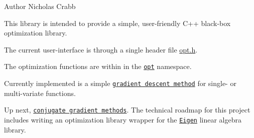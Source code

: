 \begin{DoxyAuthor}{Author}
Nicholas Crabb
\end{DoxyAuthor}
This library is intended to provide a simple, user-\/friendly C++ black-\/box optimization library.

The current user-\/interface is through a single header file \mbox{\hyperlink{opt_8h_source}{opt.\+h}}.

The optimization functions are within in the \href{https://charelstoncrabb.github.io/basic_opt/html/namespaceopt.html}{\tt opt} namespace.

Currently implemented is a simple \href{https://en.wikipedia.org/wiki/Gradient_descent}{\tt gradient descent method} for single-\/ or multi-\/variate functions.

Up next, \href{https://en.wikipedia.org/wiki/Conjugate_gradient_method}{\tt conjugate gradient methods}. The technical roadmap for this project includes writing an optimization library wrapper for the \href{http://eigen.tuxfamily.org/index.php?title=Main_Page}{\tt Eigen} linear algebra library. 